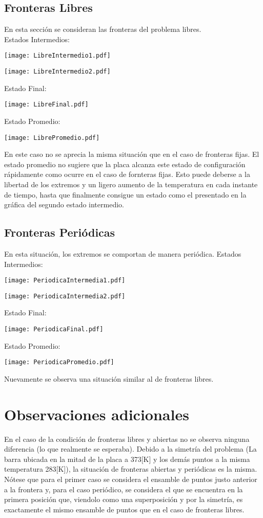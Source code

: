 \documentclass[11pt,letterpaper]{exam}
\begin{document}
\subsection{Fronteras Libres}
En esta sección se consideran las fronteras del problema libres.\\
Estados Intermedios:
\begin{center}
\texttt{[image: LibreIntermedio1.pdf]} 
\end{center}
\begin{center}
\texttt{[image: LibreIntermedio2.pdf]} 
\end{center}
Estado Final:
\begin{center}
\texttt{[image: LibreFinal.pdf]} 
\end{center}
Estado Promedio:
\begin{center}
\texttt{[image: LibrePromedio.pdf]} 
\end{center}
En este caso no se aprecia la misma situación que en el caso de fronteras fijas. El estado promedio no sugiere que la placa alcanza este estado de configuración rápidamente como ocurre en el caso de fornteras fijas. Esto puede deberse a la libertad de los extremos y un ligero aumento de la temperatura en cada instante de tiempo, hasta que finalmente consigue un estado como el presentado en la gráfica del segundo estado intermedio. 
\subsection{Fronteras Periódicas}
En esta situación, los extremos se comportan de manera periódica.
Estados Intermedios:
\begin{center}
\texttt{[image: PeriodicaIntermedia1.pdf]} 
\end{center}
\begin{center}
\texttt{[image: PeriodicaIntermedia2.pdf]} 
\end{center}
Estado Final:
\begin{center}
\texttt{[image: PeriodicaFinal.pdf]} 
\end{center}
Estado Promedio:
\begin{center}
\texttt{[image: PeriodicaPromedio.pdf]} 
\end{center}
Nuevamente se observa una situación similar al de fronteras libres.
\section{Observaciones adicionales}
En el caso de la condición de fronteras libres y abiertas no se observa ninguna diferencia (lo que realmente se esperaba). Debido a la simetría del problema (La barra ubicada en la mitad de la placa a 373[K] y los demás puntos a la misma temperatura 283[K]), la situación de fronteras abiertas y periódicas es la misma. Nótese que para el primer caso se considera el ensamble de puntos justo anterior a la frontera y, para el caso periódico, se considera el que se encuentra en la primera posición que, viendolo como una superposición y por la simetría, es exactamente el mismo ensamble de puntos que en el caso de fronteras libres. 
\end{document}
